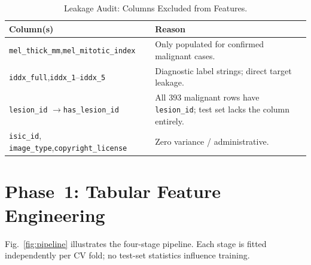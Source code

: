\documentclass[conference]{IEEEtran}
\begin{document}
\begin{table}[!t]
  \centering
  \caption{Leakage Audit: Columns Excluded from Features.}
  \label{tab:leakage}
  \renewcommand{\arraystretch}{1.1}
  \begin{tabular}{p{3.1cm}p{4.5cm}}
    \toprule
    \textbf{Column(s)} & \textbf{Reason} \\
    \midrule
    \texttt{mel\_thick\_mm},\newline\texttt{mel\_mitotic\_index}
      & Only populated for confirmed malignant cases. \\
    \texttt{iddx\_full},\newline\texttt{iddx\_1}--\texttt{iddx\_5}
      & Diagnostic label strings; direct target leakage. \\
    \texttt{lesion\_id} $\to$\newline\texttt{has\_lesion\_id}
      & All 393 malignant rows have \texttt{lesion\_id}; test set lacks the column entirely. \\
    \texttt{isic\_id}, \texttt{image\_type},\newline\texttt{copyright\_license}
      & Zero variance / administrative. \\
    \bottomrule
  \end{tabular}
\end{table}

\section{Phase~1: Tabular Feature Engineering}

Fig.~\ref{fig:pipeline} illustrates the four-stage pipeline.
Each stage is fitted independently per CV fold; no test-set
statistics influence training.
\end{document}
